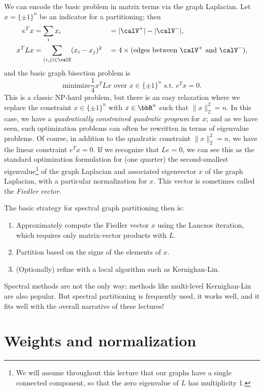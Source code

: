 \documentclass[12pt, leqno]{article} %
\begin{document}
We can encode the basic problem in matrix terms via the graph
Laplacian.  Let $x = \{ \pm 1 \}^n$ be an indicator for a partitioning;
then
\begin{align*}
  e^T x &= \sum_i x_i &&= |\calV^+|-|\calV^-|, \\
  x^T L x &= \sum_{(i,j) \in \calE} (x_i-x_j)^2 &&=
    4 \times (\mbox{edges between } \calV^+ \mbox{ and } \calV^-),
\end{align*}
and the basic graph bisection problem is
\[
  \mbox{minimize} 
  \frac{1}{4} x^T L x
  \mbox{ over } x \in \{\pm 1\}^n
  \mbox{ s.t.~} e^T x = 0.
\]
This is a classic NP-hard problem, but there is an easy relaxation
where we replace the constraint $x \in \{ \pm 1 \}^n$ with
$x \in \bbR^n$ such that $\|x\|_2^2 = n$.  In this case, we have
a {\em quadratically constrained quadratic program} for $x$; and
as we have seen, such optimization problems can often be rewritten
in terms of eigenvalue problems.  Of course, in addition to the
quadratic constraint $\|x\|_2^2 = n$, we have the linear constraint
$e^T x = 0$.  If we recognize that $Le = 0$, we can see this
as the standard optimization formulation for (one quarter)
the second-smallest eigenvalue\footnote{%
  We will assume throughout this lecture that our graphs have a single
  connected component, so that the zero eigenvalue of $L$ has
  multiplicity 1.
}
of the graph Laplacian and associated eigenvector $x$ of the graph
Laplacian, with a particular normalization for $x$.  This vector is
sometimes called the {\em Fiedler vector}.

The basic strategy for spectral graph partitioning then is:
\begin{enumerate}
\item
  Approximately compute the Fiedler vector $x$ using the Lanczos
  iteration, which requires only matrix-vector products with $L$.
\item
  Partition based on the signs of the elements of $x$.
\item
  (Optionally) refine with a local algorithm such as Kernighan-Lin.
\end{enumerate}
Spectral methods are not the only way; methods like multi-level
Kernighan-Lin are also popular.  But spectral partitioning is frequently
used, it works well, and it fits well with the overall narrative of
these lectures!

\section{Weights and normalization}
\end{document}
